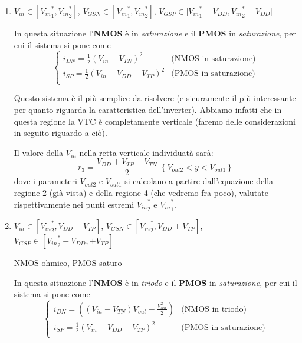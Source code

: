 \documentclass[a4paper,11pt]{article}
\begin{document}
\begin{enumerate}
\item 
\begin{center}
$V_{in} \in [{V_{in}}^*_1, {V_{in}}^*_2]$,
$V_{GSN} \in [{V_{in}}^*_1, {V_{in}}^*_2]$,
$V_{GSP} \in [{V_{in}}^*_1 - V_{DD}, {V_{in}}^*_2 - V_{DD}$] \\
\end{center}

In questa situazione l'\textbf{NMOS} è in \textit{saturazione} e il \textbf{PMOS} in \textit{saturazione}, per cui il sistema si pone come
$$
\begin{cases}
i_{DN}=\frac{1}{2}\left(V_{in}-V_{TN}\right)^{2} & \text{(NMOS in saturazione)} \\
i_{SP}=\frac{1}{2}\left(V_{in}-V_{DD}-V_{TP}\right)^{2} & \text{(PMOS in saturazione)} \\
\end{cases}
$$

Questo sistema è il più semplice da risolvere (e sicuramente il più interessante per quanto riguarda la caratteristica dell'inverter). Abbiamo infatti che in questa regione la VTC è completamente verticale (faremo delle considerazioni in seguito riguardo a ciò). 

Il valore della $V_{in}$ nella retta verticale individuatà sarà:
$$
r_{3}=\frac{V_{DD}+V_{TP}+V_{TN}}{2}\ \left\{V_{out2}<y<V_{out1}\right\}
$$
dove i parameteri $V_{out2}$ e $V_{out1}$ si calcolano a partire dall'equazione della regione 2 (già vista) e della regione 4 (che vedremo fra poco), valutate rispettivamente nei punti estremi ${V_{in}}^*_2$ e ${V_{in}}^*_1$.

\item 
\begin{center}
$V_{in} \in [{V_{in}}^*_2, V_{DD} + V_{TP}]$,
$V_{GSN} \in [{V_{in}}^*_2, V_{DD} + V_{TP}]$,
$V_{GSP} \in [{V_{in}}^*_2 - V_{DD}, + V_{TP}]$ \\
\end{center}

\begin{center}
\textsf{NMOS ohmico}, \textsf{PMOS saturo}
\end{center}

In questa situazione l'\textbf{NMOS} è in \textit{triodo} e il \textbf{PMOS} in \textit{saturazione}, per cui il sistema si pone come
$$
\begin{cases}
i_{DN}=\left(\left(V_{in}-V_{TN}\right)V_{out}-\frac{V_{out}^{2}}{2}\right) & \text{(NMOS in triodo)} \\
i_{SP}=\frac{1}{2}\left(V_{in}-V_{DD}-V_{TP}\right)^{2} & \text{(PMOS in saturazione)} \\
\end{cases}
$$


\end{enumerate}
\end{document}
